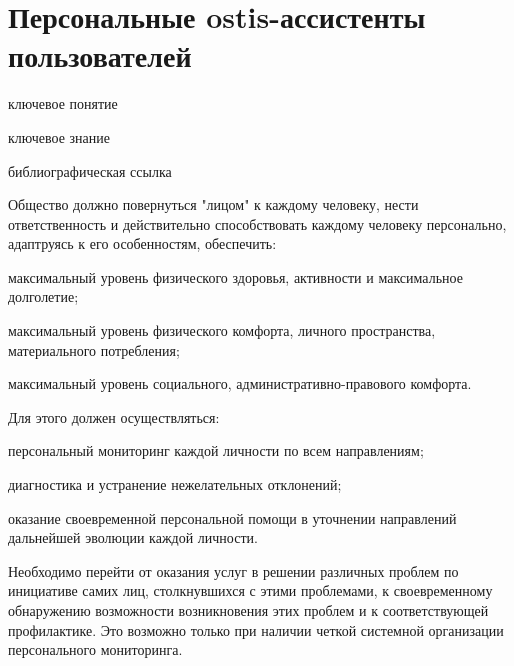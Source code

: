 \section{Персональные ostis-ассистенты пользователей}
{\label{sec_ostis_assistant}} 

\begin{SCn}

\bigskip

\begin{scnrelfromlist}{ключевое понятие}
\end{scnrelfromlist}

\bigskip

\begin{scnrelfromlist}{ключевое знание}
\end{scnrelfromlist}

\bigskip

\begin{scnrelfromlist}{библиографическая ссылка}
\end{scnrelfromlist}

\end{SCn}

Общество должно повернуться "лицом"{} к каждому человеку, нести ответственность и действительно способствовать каждому человеку персонально, адаптруясь к его особенностям, обеспечить:
\begin{textitemize}
    \item максимальный уровень физического здоровья, активности и максимальное долголетие;
    \item максимальный уровень физического комфорта, личного пространства, материального потребления;
    \item максимальный уровень социального, административно-правового комфорта.
\end{textitemize}

Для этого должен осуществляться:
\begin{textitemize}
    \item персональный мониторинг каждой личности по всем направлениям;
    \item диагностика и устранение нежелательных отклонений;
    \item оказание своевременной персональной помощи в уточнении направлений дальнейшей эволюции каждой личности.
\end{textitemize}

Необходимо перейти от оказания услуг в решении различных проблем по инициативе самих лиц, столкнувшихся с этими проблемами, к своевременному обнаружению возможности возникновения этих проблем и к соответствующей профилактике. 
Это возможно только при наличии четкой системной организации персонального мониторинга. 


